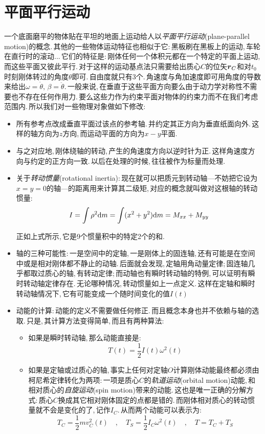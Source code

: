 \section{平面平行运动}
一个底面磨平的物体贴在平坦的地面上运动给人以\emph{平面平行运动}(plane-parallel motion)的概念.\,其他的一些物体运动特征也相似于它:\,黑板刷在黑板上的运动,\,车轮在直行时的滚动...\,它们的特征是:\,刚体任何一个体积元都在一个特定的平面上运动,\,而这些平面又彼此平行.\,对于这样的运动基点法只需要给出质心$C$的位矢$\boldsymbol{r}_C$和对$t_0$时刻刚体转过的角度$\theta$即可.\,自由度就只有3个.\,角速度与角加速度即可用角度的导数来给出$\omega=\dot{\theta},\,\beta=\ddot{\theta}$.\,一般来说,\,在垂直于这些平面方向要么由于动力学对称性不需要也不存在任何作用力.\,要么这些力作为约束平面对物体的约束力而不在我们考虑范围内.\,所以我们对一些物理对象做如下修改:\,
\begin{itemize}
\item 所有参考点改成垂直平面过该点的参考轴.\,并约定其正方向为垂直纸面向外.\,这样的轴方向为$z$方向,\,而运动平面的方向为$x-y$平面.
\item 与之对应地,\,刚体绕轴的转动,\,产生的角速度方向以逆时针为正.\,这样角速度方向与约定的正方向一致.\,以后在处理的时候,\,往往被作为标量而处理.
\item 关于\emph{转动惯量}(rotational inertia):\,现在就可以把质元到转动轴---不妨把它设为$x=y=0$的轴---的距离用来计算其二级矩,\,对应的概念就叫做对这根轴的转动惯量:
\[I=\int \rho^2\textrm{d} m=\int (x^2+y^2)\textrm{d} m=M_{xx}+M_{yy}\]

正如上式所示,\,它是9个惯量积中的特定2个的和.
\item 轴的三种可能性:\,一是空间中的定轴,\,一是刚体上的固连轴,\,还有可能是在空间中或是相对刚体都不静止的动轴.\,后面就会发现,\,定轴用角动量定律;\,固连轴几乎都取过质心的轴,\,有转动定律;\,而动轴也有瞬时转动轴的特例,\,可以证明有瞬时转动轴定律存在.\,无论哪种情况,\,转动惯量如上一点定义.\,这样在定轴和瞬时转动轴情况下,\,它有可能变成一个随时间变化的值$I(t)$
\item 动能的计算:\,动能的定义不需要做任何修正.\,而且概念本身也并不依赖与轴的选取.\,只是,\,其计算方法变得简单,\,而且有两种算法:
\begin{itemize}
	\item 如果是瞬时转动轴,\,那么动能直接是:
	\[T(t)=\frac{1}{2}I(t)\omega^2(t)\]

	\item 如果是定轴或过质心的轴,\,事实上任何对定轴$O$计算刚体动能最终都必须由柯尼希定律转化为两项:\,一项是质心$C$的\emph{轨道运动}(orbital motion)动能,\,和相对质心的\emph{自旋运动}(spin motion)带来的动能.\,这也是唯一正确的分解方式:\,质心$C$换成其它相对刚体固定的点都是错的.\,而刚体相对质心的转动惯量就不会是变化的了,\,记作$I_C$.\,从而两个动能可以表示为:
	\[T_C=\frac{1}{2}mv_C^2(t)\quad,\quad T_S=\frac{1}{2}I_C\omega^2(t)\quad,\quad T=T_C+T_S\]
\end{itemize}


\end{itemize}
